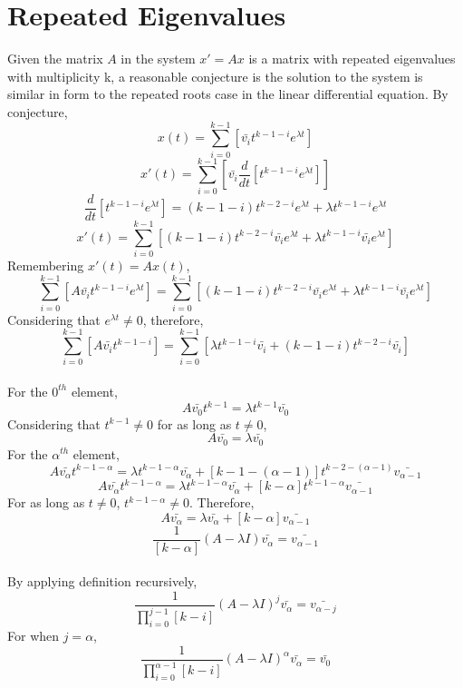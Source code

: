 \section{Repeated Eigenvalues}
\begin{comment}
\end{comment}
Given the matrix $A$ in the system $x' = Ax$ is a matrix with repeated eigenvalues with multiplicity k, a reasonable conjecture is the solution to the system is similar in form to the repeated roots case in the linear differential equation. By conjecture,
$$x(t) = \sum_{i = 0}^{k - 1}\left[\bar{v_i} t^{k - 1 - i}e^{\lambda t}\right]$$
$$x'(t) = \sum_{i = 0}^{k - 1}\left[\bar{v_i} \frac{d}{dt}\left[t^{k - 1 - i}e^{\lambda t}\right] \right]$$
$$\frac{d}{dt}\left[t^{k - 1 - i}e^{\lambda t}\right] = (k - 1 - i)t^{k - 2 - i}e^{\lambda t} + \lambda t^{k - 1 - i}e^{\lambda t} $$
$$x'(t) = \sum_{i = 0}^{k - 1}\left[(k - 1 - i)t^{k - 2 - i}\bar{v_i}e^{\lambda t} + \lambda t^{k - 1 - i}\bar{v_i}e^{\lambda t} \right]$$
Remembering $x'(t) = Ax(t)$,
$$\sum_{i = 0}^{k - 1}\left[A\bar{v_i} t^{k - 1 - i}e^{\lambda t}\right] = \sum_{i = 0}^{k - 1}\left[ (k - 1 - i)t^{k - 2 - i}\bar{v_i}e^{\lambda t} + \lambda t^{k - 1 - i}\bar{v_i}e^{\lambda t} \right]$$
Considering that $e^{\lambda t} \neq 0$, therefore, 
$$\sum_{i = 0}^{k - 1}\left[A\bar{v_i} t^{k - 1 - i}\right] = \sum_{i = 0}^{k - 1}\left[ \lambda t^{k - 1 - i}\bar{v_i} + (k - 1 - i)t^{k - 2 - i}\bar{v_i}\right]$$
\\For the $0^{th}$ element,
$$A\bar{v_0}t^{k - 1} = \lambda t^{k - 1}\bar{v_0}$$
Considering that $t^{k - 1} \neq 0$ for as long as $t \neq 0$,
$$A\bar{v_0} = \lambda \bar{v_0}$$
For the $\alpha^{th}$ element, 
$$A\bar{v_\alpha} t^{k - 1 - \alpha} = \lambda t^{k - 1 - \alpha}\bar{v_\alpha} +  \left[k - 1 - (\alpha - 1)\right]t^{k - 2 - (\alpha - 1)}\bar{v_{\alpha - 1}}$$
$$A\bar{v_\alpha} t^{k - 1 - \alpha} = \lambda t^{k - 1 - \alpha}\bar{v_\alpha} +  \left[k - \alpha \right]t^{k - 1 - \alpha}\bar{v_{\alpha - 1}}$$
For as long as $t\neq 0$,  $t^{k - 1- \alpha}\neq 0$. Therefore, 
$$A\bar{v_\alpha} = \lambda \bar{v_\alpha} +  \left[k - \alpha \right]\bar{v_{\alpha - 1}}$$
$$\frac{1}{\left[k - \alpha \right]} (A - \lambda I)\bar{v_\alpha} = \bar{v_{\alpha - 1}}$$
\\By applying definition recursively,
$$\frac{1}{\displaystyle{\prod_{i = 0}^{j - 1}\left[k - i \right]}} (A - \lambda I)^j \bar{v_\alpha} = \bar{v_{\alpha - j}}$$
For when $j = \alpha$,
$$\frac{1}{\displaystyle{\prod_{i = 0}^{\alpha - 1}\left[k - i \right]}} (A - \lambda I)^\alpha \bar{v_\alpha} = \bar{v_{0}}$$
